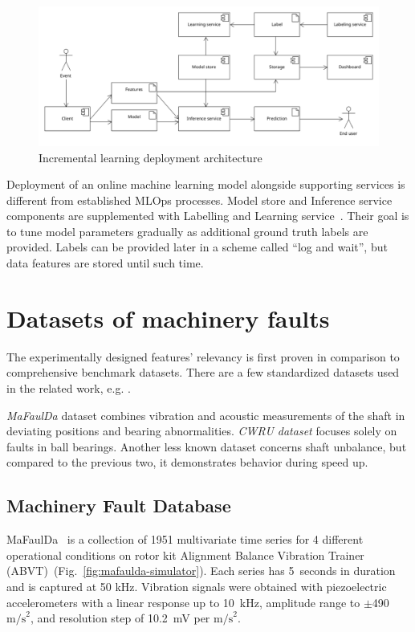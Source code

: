 \begin{figure}[ht]
    \centering
    \includegraphics[width=\textwidth]{assets/analysis/incremental-learning.png}
    \caption{Incremental learning deployment architecture~\cite{gaia_online_2022}}
    \label{fig:online-learn-arch}
\end{figure} 

Deployment of an online machine learning model alongside supporting services is different from established MLOps processes. Model store and Inference service components are supplemented with Labelling and Learning service~\cite{gaia_online_2022}. Their goal is to tune model parameters gradually as additional ground truth labels are provided. Labels can be provided later in a scheme called ``log and wait'', but data features are stored until such time.
  
\section{Datasets of machinery faults} \label{section:evaluation-datasets}
The experimentally designed features' relevancy is first proven in comparison to comprehensive benchmark datasets. There are a few standardized datasets used in the related work, e.g. \cite{ribeiro_rotating_2017}.

\emph{MaFaulDa} dataset combines vibration and acoustic measurements of the shaft in deviating positions and bearing abnormalities. \emph{CWRU dataset} focuses solely on faults in ball bearings. Another less known dataset concerns shaft unbalance, but compared to the previous two, it demonstrates behavior during speed up.  

\subsection{Machinery Fault Database}
MaFaulDa~\cite{mafaulda_dataset} is a collection of 1951 multivariate time series for 4 different operational conditions on rotor kit Alignment Balance Vibration Trainer (ABVT)~(Fig.~\ref{fig:mafaulda-simulator}). Each series has 5~seconds in duration and is captured at 50 kHz. Vibration signals were obtained with piezoelectric accelerometers with a linear response up to 10~kHz, amplitude range to $\pm$490 $\mathrm{m/s}^2$, and resolution step of 10.2~mV per $\mathrm{m/s}^2$. 

